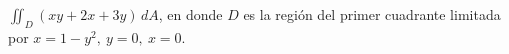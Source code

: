 \item $\iint_D (xy + 2x + 3y) \, dA$, en donde $D$ es la región del primer cuadrante limitada por $x = 1 - y^2, \ y = 0, \ x = 0$.
